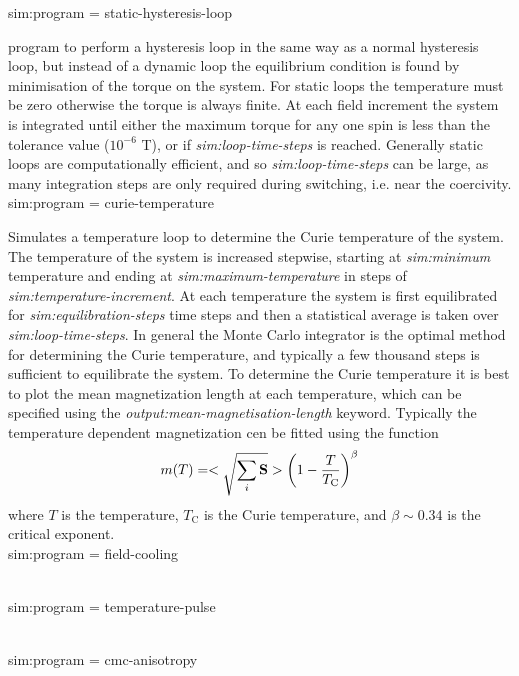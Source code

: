 {\zicf sim:program = static-hysteresis-loop} program to perform a hysteresis loop in the same way as a normal hysteresis loop, but instead of a dynamic loop the equilibrium condition is found by minimisation of the torque on the system. For static loops the temperature must be zero otherwise the torque is always finite. At each field increment the system is integrated until either the maximum torque for any one spin is less than the tolerance value ($10^{-6}$ T), or if \textit{sim:loop-time-steps} is reached. Generally static loops are computationally efficient, and so \textit{sim:loop-time-steps} can be large, as many integration steps are only required during switching, i.e. near the coercivity.\\

{\zicf sim:program = curie-temperature} Simulates a temperature loop to determine the Curie temperature of the system. The temperature of the system is increased stepwise, starting at \textit{sim:minimum} temperature and ending at \textit{sim:maximum-temperature} in steps of \textit{sim:temperature-increment}. At each temperature the system is first equilibrated for \textit{sim:equilibration-steps} time steps and then a statistical average is taken over \textit{sim:loop-time-steps}. In general the Monte Carlo integrator is the optimal method for determining the Curie temperature, and typically a few thousand steps is sufficient to equilibrate the system. To determine the Curie temperature it is best to plot the mean magnetization length at each temperature, which can be specified using the \textit{output:mean-magnetisation-length} keyword. Typically the temperature dependent magnetization cen be fitted using the function
\begin{equation}
m(T) = <\sqrt{\sum_i \mathbf{S}}> \left(1 - \frac{T}{T_{\mathrm{C}}} \right)^{\beta}
\end{equation}
where $T$ is the temperature, $T_{\mathrm{C}}$ is the Curie temperature, and $\beta \sim 0.34$ is the critical exponent.\\

{\zicf sim:program = field-cooling}
\\

{\zicf sim:program = temperature-pulse}\\

{\zicf sim:program = cmc-anisotropy}\\

